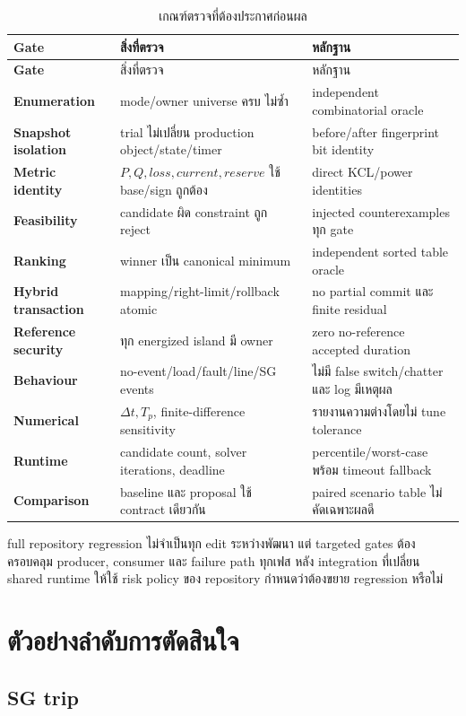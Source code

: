 \documentclass[12pt,a4paper]{article}
\begin{document}
\begin{longtable}{>{\bfseries}p{}p{}p{}}
\caption{เกณฑ์ตรวจที่ต้องประกาศก่อนผล}\label{tab:verification}\\
\toprule
Gate & สิ่งที่ตรวจ & หลักฐาน \\
\midrule\endfirsthead
\toprule Gate & สิ่งที่ตรวจ & หลักฐาน \\
\midrule\endhead
Enumeration & mode/owner universe ครบ ไม่ซ้ำ & independent combinatorial oracle \\
Snapshot isolation & trial ไม่เปลี่ยน production object/state/timer & before/after fingerprint bit identity \\
Metric identity & $P,Q,loss,current,reserve$ ใช้ base/sign ถูกต้อง & direct KCL/power identities \\
Feasibility & candidate ผิด constraint ถูก reject & injected counterexamples ทุก gate \\
Ranking & winner เป็น canonical minimum & independent sorted table oracle \\
Hybrid transaction & mapping/right-limit/rollback atomic & no partial commit และ finite residual \\
Reference security & ทุก energized island มี owner & zero no-reference accepted duration \\
Behaviour & no-event/load/fault/line/SG events & ไม่มี false switch/chatter และ log มีเหตุผล \\
Numerical & $\Delta t,T_p$, finite-difference sensitivity & รายงานความต่างโดยไม่ tune tolerance \\
Runtime & candidate count, solver iterations, deadline & percentile/worst-case พร้อม timeout fallback \\
Comparison & baseline และ proposal ใช้ contract เดียวกัน & paired scenario table ไม่คัดเฉพาะผลดี \\
\bottomrule
\end{longtable}

full repository regression ไม่จำเป็นทุก edit ระหว่างพัฒนา แต่ targeted gates ต้องครอบคลุม producer,
consumer และ failure path ทุกเฟส หลัง integration ที่เปลี่ยน shared runtime ให้ใช้ risk policy ของ repository
กำหนดว่าต้องขยาย regression หรือไม่

\section{ตัวอย่างลำดับการตัดสินใจ}

\subsection{SG trip}
\end{document}
